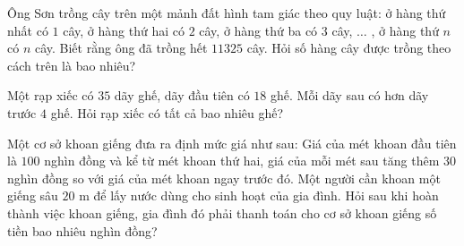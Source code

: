 \begin{ex}%
	Ông Sơn trồng cây trên một mảnh đất hình tam giác theo quy luật: ở hàng thứ nhất có $1$ cây, ở hàng thứ hai có $2$ cây, ở hàng thứ ba có $3$ cây, $\ldots$ , ở hàng thứ $n$ có  $n$ cây. Biết rằng ông đã trồng hết $11325$ cây. Hỏi số hàng cây được trồng theo cách trên là bao nhiêu?
\end{ex}

\begin{ex}%
	Một rạp xiếc có $35$ dãy ghế, dãy đầu tiên có $18$ ghế. Mỗi dãy sau có hơn  dãy trước $4$ ghế. Hỏi rạp xiếc có tất cả bao nhiêu ghế?
\end{ex}

\begin{ex}%
	Một cơ sở khoan giếng đưa ra định mức giá như sau: Giá của mét khoan đầu tiên là $100$ nghìn đồng và kể từ mét khoan thứ hai, giá của mỗi mét sau tăng thêm $30$ nghìn đồng so với giá của mét khoan ngay trước đó. Một người cần khoan một giếng sâu $20$ m để lấy nước dùng cho sinh hoạt của gia đình. Hỏi sau khi hoàn thành việc khoan giếng, gia  đình đó phải thanh toán cho cơ sở khoan giếng số tiền bao nhiêu nghìn đồng?
\end{ex}


